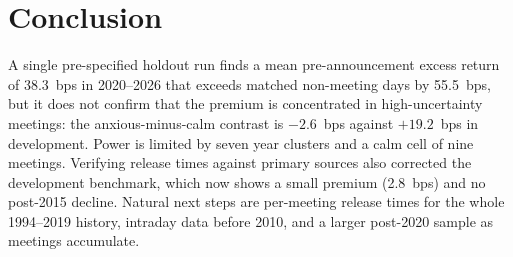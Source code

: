 \section{Conclusion}
A single pre-specified holdout run finds a mean pre-announcement excess return of 38.3~bps in 2020--2026 that exceeds matched non-meeting days by 55.5~bps, but it does not confirm that the premium is concentrated in high-uncertainty meetings: the anxious-minus-calm contrast is $-2.6$~bps against $+19.2$~bps in development. Power is limited by seven year clusters and a calm cell of nine meetings. Verifying release times against primary sources also corrected the development benchmark, which now shows a small premium (2.8~bps) and no post-2015 decline. Natural next steps are per-meeting release times for the whole 1994--2019 history, intraday data before 2010, and a larger post-2020 sample as meetings accumulate.